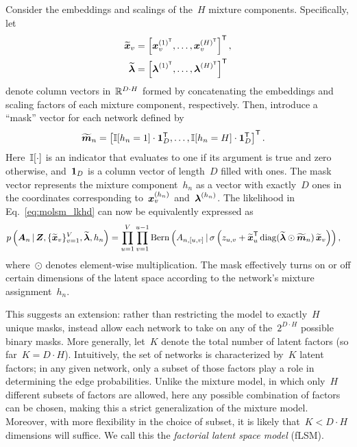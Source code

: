 Consider the embeddings and scalings of
the~$H$ mixture components.  Specifically, let
\begin{align}
  \widetilde{\boldsymbol{x}}_v &= \left[\boldsymbol{x}_v^{(1)^{\mathsf{T}}}, \ldots, \boldsymbol{x}_v^{(H)^{\mathsf{T}}}\right]^{\mathsf{T}}, \\
  \widetilde{\boldsymbol{\lambda}} &= \left[\boldsymbol{\lambda}^{(1)^{\mathsf{T}}}, \ldots, \boldsymbol{\lambda}^{(H)^{\mathsf{T}}} \right]^{\mathsf{T}}
\end{align}
denote column vectors in~$\mathbb{R}^{D \cdot H}$ formed by concatenating the
embeddings and scaling factors of each mixture component, respectively.
Then, introduce a ``mask'' vector for each network defined by
\begin{align}
  \widetilde{\boldsymbol{m}}_n &= \left[ \mathbb{I}[h_n=1] \cdot \boldsymbol{1}_D^{\mathsf{T}}, \ldots, \mathbb{I}[h_n=H] \cdot \boldsymbol{1}_D^{\mathsf{T}} \right]^{\mathsf{T}}.
\end{align}
Here~$\mathbb{I}[\cdot]$ is an indicator that evaluates to one if its
argument is true and zero otherwise, and~$\boldsymbol{1}_D$ is a column vector
of length~$D$ filled with ones. The mask vector represents
the mixture component~$h_n$ as a
vector with exactly~$D$ ones in the coordinates corresponding
to~$\boldsymbol{x}_v^{(h_n)}$ and~$\boldsymbol{\lambda}^{(h_n)}$. The likelihood in Eq.~\eqref{eq:molsm_lkhd} can now
be equivalently expressed as
\begin{align}
  \label{eq:flsm_lkhd}
  p \left(\boldsymbol{A}_n \, | \,
  \boldsymbol{Z}, \{\widetilde{\boldsymbol{x}}_v\}_{v=1}^V,
  \widetilde{\boldsymbol{\lambda}}, h_n \right) 
  &= \prod_{u=1}^V \prod_{v=1}^{u-1}
  \mathrm{Bern} \left(A_{n,[u,v]} \, | \,
    \sigma \left(z_{u,v} + \widetilde{\boldsymbol{x}}_{u}^{\mathsf{T}}
    \operatorname{diag}(\widetilde{\boldsymbol{\lambda}} \odot \widetilde{\boldsymbol{m}}_n) \,
    \widetilde{\boldsymbol{x}}_v \right) \right),
\end{align}
where~$\odot$ denotes element-wise multiplication. The mask effectively
turns on or off certain dimensions of the latent space according to
the network's mixture assignment~$h_n$.

This suggests an extension: rather than restricting the model
to exactly~$H$ unique masks, instead allow each network to take on any
of the~$2^{D \cdot H}$ possible binary masks. More generally, let~$K$
denote the total number of latent factors (so far~${K=D \cdot
  H}$). Intuitively, the set of networks is characterized by~$K$
latent factors; in any given network, only a subset of those factors
play a role in determining the edge probabilities. Unlike the mixture
model, in which only~$H$ different subsets of factors are allowed, here any
possible combination of factors can be chosen, making this a strict
generalization of the mixture model.  Moreover, with more flexibility
in the choice of subset, it is likely that~${K < D \cdot H}$
dimensions will suffice. We call this the \emph{factorial latent space model} (fLSM).

